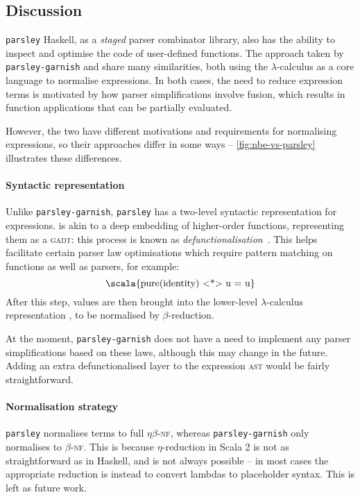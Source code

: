 \documentclass[../../../main.tex]{subfiles}
\begin{document}
\subsection*{Discussion}
\texttt{parsley} Haskell, as a \emph{staged} parser combinator library, also has the ability to inspect and optimise the code of user-defined functions.
The approach taken by \texttt{parsley-garnish} and  share many similarities, both using the $\lambda$-calculus as a core language to normalise expressions.
In both cases, the need to reduce expression terms is motivated by how parser simplifications involve fusion, which results in function applications that can be partially evaluated.

However, the two have different motivations and requirements for normalising expressions, so their approaches differ in some ways --
\cref{fig:nbe-vs-parsley} illustrates these differences.

\paragraph{Syntactic representation}
Unlike \texttt{parsley-garnish}, \texttt{parsley} has a two-level syntactic representation for expressions.
 is akin to a deep embedding of higher-order functions, representing them as a \textsc{gadt}: this process is known as \emph{defunctionalisation}~\cite{reynolds_defunc_1972,danvy_defunctionalization_2001}.
This helps facilitate certain parser law optimisations which require pattern matching on functions as well as parsers, for example:
\begin{equation*}
\text{\scala{pure(identity) <*> u = u}}
\end{equation*}
After this step,  values are then brought into the lower-level $\lambda$-calculus representation , to be normalised by $\beta$-reduction.

At the moment, \texttt{parsley-garnish} does not have a need to implement any parser simplifications based on these laws, although this may change in the future.
Adding an extra defunctionalised layer to the expression \textsc{ast} would be fairly straightforward.

\paragraph{Normalisation strategy}
\texttt{parsley} normalises terms to full $\eta\beta$-\textsc{nf}, whereas \texttt{parsley-garnish} only normalises to $\beta$-\textsc{nf}.
This is because $\eta$-reduction in Scala 2 is not as straightforward as in Haskell, and is not always possible -- in most cases the appropriate reduction is instead to convert lambdas to placeholder syntax.
This is left as future work.
\end{document}
